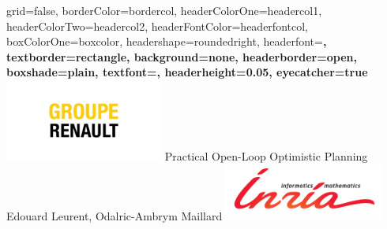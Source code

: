 \documentclass[a0paper,portrait,fontscale=0.35, margin=2cm]{baposter}
\begin{document}
\begin{poster}{
grid=false,
borderColor=bordercol, %
headerColorOne=headercol1, %
headerColorTwo=headercol2, %
headerFontColor=headerfontcol, %
boxColorOne=boxcolor, %
headershape=roundedright, %
headerfont=\Large\bf\textsc, %
textborder=rectangle,
background=none,
headerborder=open, %
boxshade=plain,
textfont={\setlength{\parindent}{0.0em}\sffamily},
headerheight={0.05\textheight},
eyecatcher=true
}
%
%
{
\includegraphics[width=14em]{./img/renault_group}
}
{
Practical Open-Loop Optimistic Planning
}
{
Edouard Leurent, Odalric-Ambrym Maillard
\vspace{-4\baselineskip}
}
{
\includegraphics[width=14em]{./img/inria_sc}
}

\setlength{\colheight}{0.92\textheight}



\end{poster}
\end{document}
